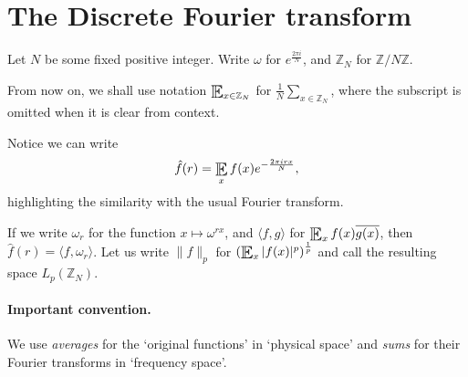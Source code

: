 \documentclass{article}
\DeclareMathOperator*{\E}{\scalerel*{\mathbb{E}}{\textstyle\sum}}
\newcommand{\1}[1]{\mathbbm{1}_{#1}}
\begin{document}
\maketitle

\tableofcontents

\clearpage
\section{The Discrete Fourier transform}
Let $N$ be some fixed positive integer. Write $\omega$ for $e^{\frac{2\pi i}{N}}$, and $\mathbb{Z}_N$ for $\mathbb{Z}/N\mathbb{Z}$.


\begin{notation}
  From now on, we shall use notation $\E_{x \in \mathbb{Z}_N}$ for $\frac{1}{N} \sum_{x \in \mathbb{Z}_N}$, where the subscript is omitted when it is clear from context.
\end{notation}

Notice we can write
\begin{equation*}
  \hat{f}(r) = \E_x f(x) e^{-\frac{2 \pi i r x}{N}},
\end{equation*}
highlighting the similarity with the usual Fourier transform.

If we write $\omega_r$ for the function $x \mapsto \omega^{r x}$, and $\langle f, g \rangle$ for $\E_x f(x) \overline{g(x)}$, then $\hat{f}(r) = \langle f, \omega_r \rangle$.
Let us write $\| f \|_p$ for $\left(\E_x |f(x)|^p\right)^{\frac{1}{p}}$ and call the resulting space $L_p(\mathbb{Z}_N)$.

\paragraph{Important convention.} We use \emph{averages} for the `original functions' in `physical space' and \emph{sums} for their Fourier transforms in `frequency space'.
\end{document}
